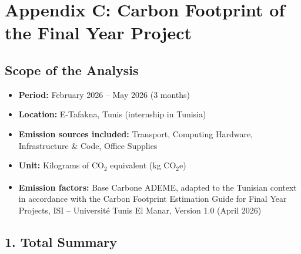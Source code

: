 
\chapter*{Appendix C: Carbon Footprint of the Final Year Project}

\section*{Scope of the Analysis}

\begin{itemize}
    \item \textbf{Period:} February 2026 -- May 2026 (3 months)
    \item \textbf{Location:} E-Tafakna, Tunis (internship in Tunisia)
    \item \textbf{Emission sources included:} Transport, Computing Hardware, Infrastructure \& Code, Office Supplies
    \item \textbf{Unit:} Kilograms of CO$_2$ equivalent (kg CO$_2$e)
    \item \textbf{Emission factors:} Base Carbone\textsuperscript{\textregistered} ADEME, adapted to the Tunisian context in accordance with the Carbon Footprint Estimation Guide for Final Year Projects, ISI -- Université Tunis El Manar, Version 1.0 (April 2026)
\end{itemize}

\section*{1. Total Summary}

